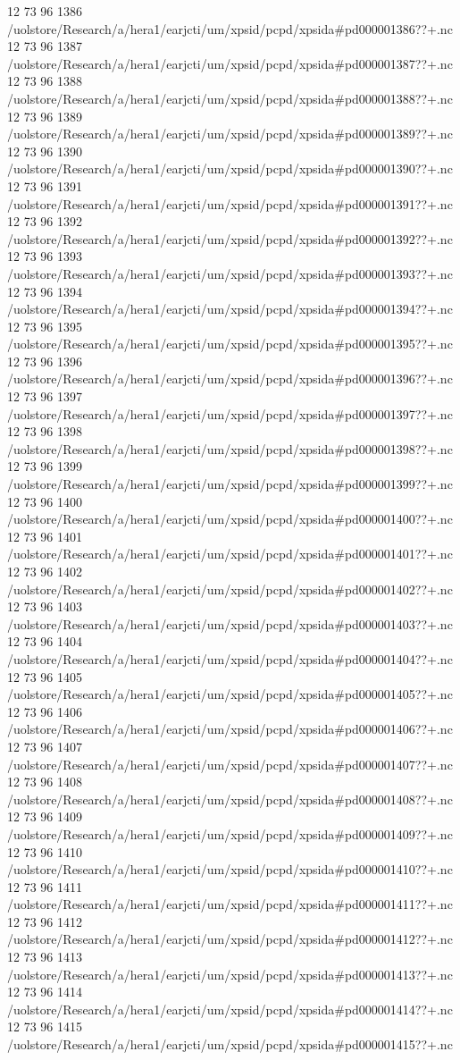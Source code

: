 12 73 96
1386
/uolstore/Research/a/hera1/earjcti/um/xpsid/pcpd/xpsida#pd000001386??+.nc
12 73 96
1387
/uolstore/Research/a/hera1/earjcti/um/xpsid/pcpd/xpsida#pd000001387??+.nc
12 73 96
1388
/uolstore/Research/a/hera1/earjcti/um/xpsid/pcpd/xpsida#pd000001388??+.nc
12 73 96
1389
/uolstore/Research/a/hera1/earjcti/um/xpsid/pcpd/xpsida#pd000001389??+.nc
12 73 96
1390
/uolstore/Research/a/hera1/earjcti/um/xpsid/pcpd/xpsida#pd000001390??+.nc
12 73 96
1391
/uolstore/Research/a/hera1/earjcti/um/xpsid/pcpd/xpsida#pd000001391??+.nc
12 73 96
1392
/uolstore/Research/a/hera1/earjcti/um/xpsid/pcpd/xpsida#pd000001392??+.nc
12 73 96
1393
/uolstore/Research/a/hera1/earjcti/um/xpsid/pcpd/xpsida#pd000001393??+.nc
12 73 96
1394
/uolstore/Research/a/hera1/earjcti/um/xpsid/pcpd/xpsida#pd000001394??+.nc
12 73 96
1395
/uolstore/Research/a/hera1/earjcti/um/xpsid/pcpd/xpsida#pd000001395??+.nc
12 73 96
1396
/uolstore/Research/a/hera1/earjcti/um/xpsid/pcpd/xpsida#pd000001396??+.nc
12 73 96
1397
/uolstore/Research/a/hera1/earjcti/um/xpsid/pcpd/xpsida#pd000001397??+.nc
12 73 96
1398
/uolstore/Research/a/hera1/earjcti/um/xpsid/pcpd/xpsida#pd000001398??+.nc
12 73 96
1399
/uolstore/Research/a/hera1/earjcti/um/xpsid/pcpd/xpsida#pd000001399??+.nc
12 73 96
1400
/uolstore/Research/a/hera1/earjcti/um/xpsid/pcpd/xpsida#pd000001400??+.nc
12 73 96
1401
/uolstore/Research/a/hera1/earjcti/um/xpsid/pcpd/xpsida#pd000001401??+.nc
12 73 96
1402
/uolstore/Research/a/hera1/earjcti/um/xpsid/pcpd/xpsida#pd000001402??+.nc
12 73 96
1403
/uolstore/Research/a/hera1/earjcti/um/xpsid/pcpd/xpsida#pd000001403??+.nc
12 73 96
1404
/uolstore/Research/a/hera1/earjcti/um/xpsid/pcpd/xpsida#pd000001404??+.nc
12 73 96
1405
/uolstore/Research/a/hera1/earjcti/um/xpsid/pcpd/xpsida#pd000001405??+.nc
12 73 96
1406
/uolstore/Research/a/hera1/earjcti/um/xpsid/pcpd/xpsida#pd000001406??+.nc
12 73 96
1407
/uolstore/Research/a/hera1/earjcti/um/xpsid/pcpd/xpsida#pd000001407??+.nc
12 73 96
1408
/uolstore/Research/a/hera1/earjcti/um/xpsid/pcpd/xpsida#pd000001408??+.nc
12 73 96
1409
/uolstore/Research/a/hera1/earjcti/um/xpsid/pcpd/xpsida#pd000001409??+.nc
12 73 96
1410
/uolstore/Research/a/hera1/earjcti/um/xpsid/pcpd/xpsida#pd000001410??+.nc
12 73 96
1411
/uolstore/Research/a/hera1/earjcti/um/xpsid/pcpd/xpsida#pd000001411??+.nc
12 73 96
1412
/uolstore/Research/a/hera1/earjcti/um/xpsid/pcpd/xpsida#pd000001412??+.nc
12 73 96
1413
/uolstore/Research/a/hera1/earjcti/um/xpsid/pcpd/xpsida#pd000001413??+.nc
12 73 96
1414
/uolstore/Research/a/hera1/earjcti/um/xpsid/pcpd/xpsida#pd000001414??+.nc
12 73 96
1415
/uolstore/Research/a/hera1/earjcti/um/xpsid/pcpd/xpsida#pd000001415??+.nc
